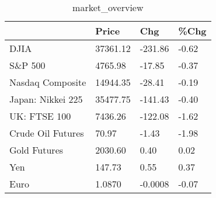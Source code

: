 \documentclass{article}%
\begin{document}
%


\begin{table}[htbp]%
\caption{market\_overview}%
\centering%
\begin{adjustbox}{width=1\textwidth}%
\begin{tabular}{llll}
\toprule
                  &    Price &     Chg &  \%Chg \\
\midrule
             DJIA & 37361.12 & -231.86 & -0.62 \\
          S\&P 500 &  4765.98 &  -17.85 & -0.37 \\
 Nasdaq Composite & 14944.35 &  -28.41 & -0.19 \\
Japan: Nikkei 225 & 35477.75 & -141.43 & -0.40 \\
     UK: FTSE 100 &  7436.26 & -122.08 & -1.62 \\
Crude Oil Futures &    70.97 &   -1.43 & -1.98 \\
     Gold Futures &  2030.60 &    0.40 &  0.02 \\
              Yen &   147.73 &    0.55 &  0.37 \\
             Euro &   1.0870 & -0.0008 & -0.07 \\
\bottomrule
\end{tabular}
%
\end{adjustbox}%
\end{table}

%
\end{document}
